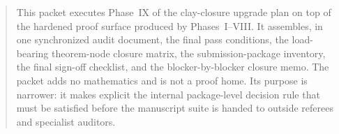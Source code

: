 \documentclass[preprint,aip,jmp,amsmath,amssymb,nofootinbib]{revtex4-2}
\begin{document}
\begin{abstract}
This packet executes Phase~IX of the clay-closure upgrade plan on top of the hardened proof surface produced by Phases~I--VIII. It assembles, in one synchronized audit document, the final pass conditions, the load-bearing theorem-node closure matrix, the submission-package inventory, the final sign-off checklist, and the blocker-by-blocker closure memo. The packet adds no mathematics and is not a proof home. Its purpose is narrower: it makes explicit the internal package-level decision rule that must be satisfied before the manuscript suite is handed to outside referees and specialist auditors.
\end{abstract}
\maketitle






\appendix

\end{document}
